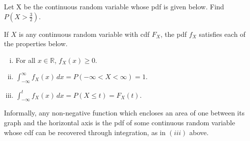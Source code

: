 \begin{examp} Let X be the continuous random variable whose pdf is given below. Find $P(X > \frac{3}{2})$.
\vspace{-0.5em}
\begin{center}
    \begin{minipage}{.5\textwidth}
        \centering
        \renewcommand*{\arraystretch}{1.35}
\vspace{1.25em}
\renewcommand*{\arraystretch}{1}
    \end{minipage}%
    \begin{minipage}{0.5\textwidth}
        \centering
\end{minipage}
\end{center}
\vspace{-0.5em}

\end{examp}
\par
\begin{prop}If $X$ is any continuous random variable with cdf $F_X$, the pdf $f_X$ satisfies each of the properties below.
\vspace{-0.5em}
\begin{enumerate}[(i)]
\item For all $x \in \mathbb{R}$, $f_X(x) \geq 0$.
\item $\int_{-\infty}^{\infty} f_X(x) \, dx = P(-\infty < X < \infty) = 1$.
\item $\int_{-\infty}^{t} f_X(x) \, dx = P(X \leq t) = F_X(t)$.
\end{enumerate}
\end{prop}
\par
Informally, any non-negative function which encloses an area of one between its graph and the horizontal axis is the pdf of some continuous random variable whose cdf can be recovered through integration, as in $(iii)$ above.

